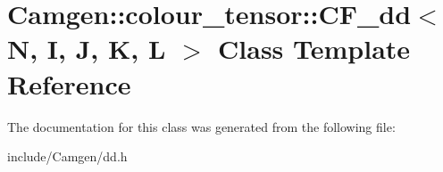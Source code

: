 \hypertarget{a00035}{\section{Camgen\-:\-:colour\-\_\-tensor\-:\-:C\-F\-\_\-dd$<$ N, I, J, K, L $>$ Class Template Reference}
\label{a00035}
}


The documentation for this class was generated from the following file\-:\begin{DoxyCompactItemize}
\item 
include/\-Camgen/dd.\-h\end{DoxyCompactItemize}

